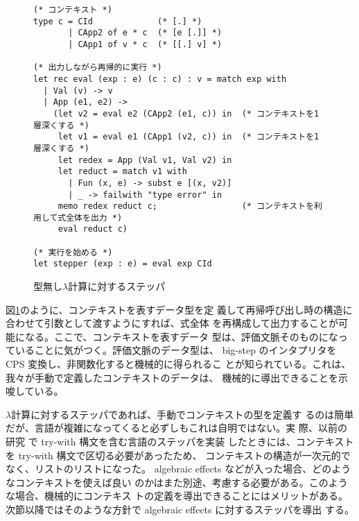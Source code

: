 \begin{figure}
\begin{verbatim}
(* コンテキスト *)
type c = CId             (* [.] *)
       | CApp2 of e * c  (* [e [.]] *)
       | CApp1 of v * c  (* [[.] v] *)

(* 出力しながら再帰的に実行 *)
let rec eval (exp : e) (c : c) : v = match exp with
  | Val (v) -> v
  | App (e1, e2) ->
    (let v2 = eval e2 (CApp2 (e1, c)) in  (* コンテキストを1層深くする *)
     let v1 = eval e1 (CApp1 (v2, c)) in  (* コンテキストを1層深くする *)
     let redex = App (Val v1, Val v2) in
     let reduct = match v1 with
       | Fun (x, e) -> subst e [(x, v2)]
       | _ -> failwith "type error" in
     memo redex reduct c;                 (* コンテキストを利用して式全体を出力 *)
     eval reduct c)

(* 実行を始める *)
let stepper (exp : e) = eval exp CId
\end{verbatim}
\caption{型無し$\lambda$計算に対するステッパ}
\label{figure:lambda_stepper}
\end{figure}

図\ref{figure:lambda_stepper}のように、コンテキストを表すデータ型を定
義して再帰呼び出し時の構造に合わせて引数として渡すようにすれば、式全体
を再構成して出力することが可能になる。ここで、コンテキストを表すデータ
型は、評価文脈そのものになっていることに気がつく。評価文脈のデータ型は、
big-step のインタプリタを CPS 変換し、非関数化すると機械的に得られるこ
とが知られている。これは、我々が手動で定義したコンテキストのデータは、
機械的に導出できることを示唆している。

$\lambda$計算に対するステッパであれば、手動でコンテキストの型を定義す
るのは簡単だが、言語が複雑になってくると必ずしもこれは自明ではない。実
際、以前の研究 \cite{FCA19} で try-with 構文を含む言語のステッパを実装
したときには、コンテキストを try-with 構文で区切る必要があったため、
コンテキストの構造が一次元的でなく、リストのリストになった。
algebraic effects などが入った場合、どのようなコンテキストを使えば良い
のかはまた別途、考慮する必要がある。このような場合、機械的にコンテキス
トの定義を導出できることにはメリットがある。
次節以降ではそのような方針で algebraic effects に対するステッパを導出
する。


